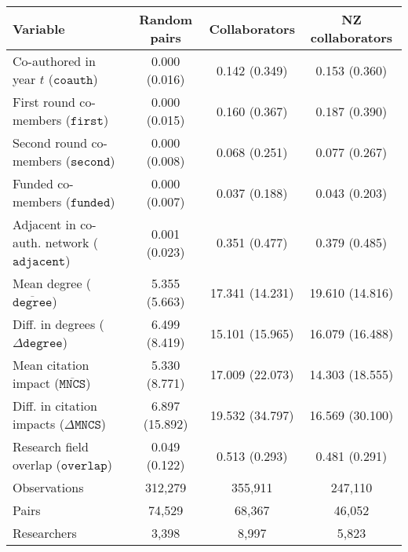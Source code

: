 
\begin{tabular}{lccc}
\toprule
Variable & Random pairs & Collaborators & NZ collaborators\\
\midrule
Co-authored in year $t$ ($\mathtt{coauth}$) & 0.000 (0.016) & 0.142 (0.349) & 0.153 (0.360)\\
First round co-members ($\mathtt{first}$) & 0.000 (0.015) & 0.160 (0.367) & 0.187 (0.390)\\
Second round co-members ($\mathtt{second}$) & 0.000 (0.008) & 0.068 (0.251) & 0.077 (0.267)\\
Funded co-members ($\mathtt{funded}$) & 0.000 (0.007) & 0.037 (0.188) & 0.043 (0.203)\\
Adjacent in co-auth. network ($\mathtt{adjacent}$) & 0.001 (0.023) & 0.351 (0.477) & 0.379 (0.485)\\
Mean degree ($\overline{\mathtt{degree}}$) & 5.355 (5.663) & 17.341 (14.231) & 19.610 (14.816)\\
Diff. in degrees ($\Delta\mathtt{degree}$) & 6.499 (8.419) & 15.101 (15.965) & 16.079 (16.488)\\
Mean citation impact ($\overline{\mathtt{MNCS}}$) & 5.330 (8.771) & 17.009 (22.073) & 14.303 (18.555)\\
Diff. in citation impacts ($\Delta\mathtt{MNCS}$) & 6.897 (15.892) & 19.532 (34.797) & 16.569 (30.100)\\
Research field overlap ($\mathtt{overlap}$) & 0.049 (0.122) & 0.513 (0.293) & 0.481 (0.291)\\
\midrule
Observations & 312,279 & 355,911 & 247,110\\
Pairs & 74,529 & 68,367 & 46,052\\
Researchers & 3,398 & 8,997 & 5,823\\
\bottomrule
\end{tabular}
